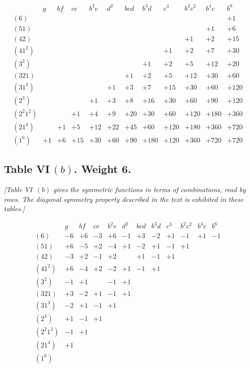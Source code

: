 \documentclass[11pt,a4paper]{book}
\begin{document}
\begin{center}
\[
\begin{array}{c|ccccccccccc}
& g & bf & ce & b^2 e & d^2 & bcd & b^3 d & c^3 & b^2 c^2 & b^4 c & b^6 \\ \hline
(6) & & & & & & & & & & & +1 \\
(51) & & & & & & & & & & +1 & +6 \\
(42) & & & & & & & & & +1 & +2 & +15 \\
(41^2) & & & & & & & & +1 & +2 & +7 & +30 \\
(3^2) & & & & & & & +1 & +2 & +5 & +12 & +20 \\
(321) & & & & & & +1 & +2 & +5 & +12 & +30 & +60 \\
(31^3) & & & & & +1 & +3 & +7 & +15 & +30 & +60 & +120 \\
(2^3) & & & & +1 & +3 & +8 & +16 & +30 & +60 & +90 & +120 \\
(2^2 1^2) & & & +1 & +4 & +9 & +20 & +30 & +60 & +120 & +180 & +360 \\
(21^4) & & +1 & +5 & +12 & +22 & +45 & +60 & +120 & +180 & +360 & +720 \\
(1^6) & +1 & +6 & +15 & +30 & +60 & +90 & +180 & +120 & +360 & +720 & +720
\end{array}
\]

\subsection*{Table VI\,$(b)$. Weight 6.}

\textit{[Table VI~$(b)$ gives the symmetric functions in terms of combinations,
read by rows. The diagonal symmetry property described in the text is
exhibited in these tables.]}

\[
\begin{array}{c|ccccccccccc}
& g & bf & ce & b^2 e & d^2 & bcd & b^3 d & c^3 & b^2 c^2 & b^4 c & b^6 \\ \hline
(6) & -6 & +6 & -3 & +6 & -1 & +3 & -2 & +1 & -1 & +1 & -1 \\
(51) & +6 & -5 & +2 & -4 & +1 & -2 & +1 & -1 & +1 \\
(42) & -3 & +2 & -1 & +2 & & +1 & -1 & +1 \\
(41^2) & +6 & -4 & +2 & -2 & +1 & -1 & +1 \\
(3^2) & -1 & +1 & & -1 & +1 \\
(321) & +3 & -2 & +1 & -1 & +1 \\
(31^3) & -2 & +1 & -1 & +1 \\
(2^3) & +1 & -1 & +1 \\
(2^2 1^2) & -1 & +1 \\
(21^4) & +1 \\
(1^6)
\end{array}
\]


\end{center}
\end{document}
